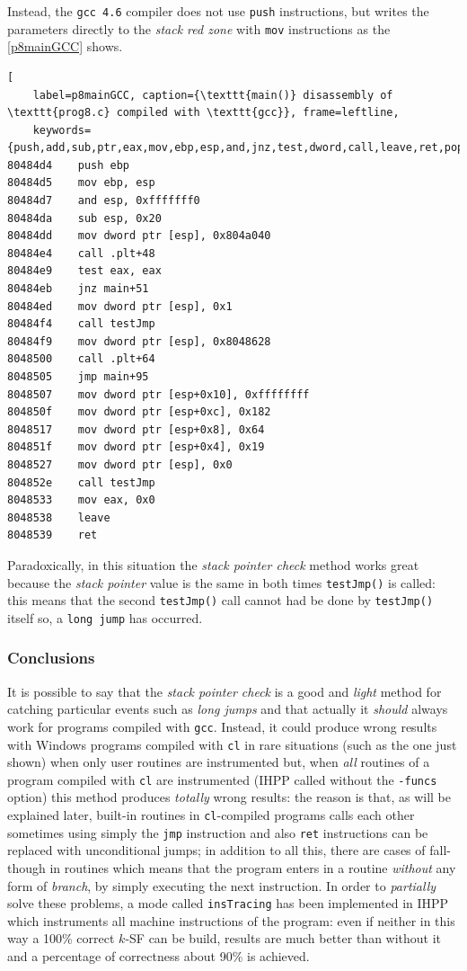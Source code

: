 \documentclass[a4paper,10pt]{report}
\begin{document}
\noindent
Instead, the \verb|gcc 4.6| compiler does not use \verb|push| instructions, but
writes the parameters directly to the \emph{stack red zone} 
with \verb|mov| instructions as the \cref{p8mainGCC} shows.

\begin{lstlisting}[ 
	label=p8mainGCC, caption={\texttt{main()} disassembly of \texttt{prog8.c} compiled with \texttt{gcc}}, frame=leftline, 
	keywords={push,add,sub,ptr,eax,mov,ebp,esp,and,jnz,test,dword,call,leave,ret,pop,jmp}]
80484d4    push ebp
80484d5    mov ebp, esp
80484d7    and esp, 0xfffffff0
80484da    sub esp, 0x20
80484dd    mov dword ptr [esp], 0x804a040
80484e4    call .plt+48
80484e9    test eax, eax
80484eb    jnz main+51
80484ed    mov dword ptr [esp], 0x1
80484f4    call testJmp
80484f9    mov dword ptr [esp], 0x8048628
8048500    call .plt+64
8048505    jmp main+95
8048507    mov dword ptr [esp+0x10], 0xffffffff
804850f    mov dword ptr [esp+0xc], 0x182
8048517    mov dword ptr [esp+0x8], 0x64
804851f    mov dword ptr [esp+0x4], 0x19
8048527    mov dword ptr [esp], 0x0
804852e    call testJmp
8048533    mov eax, 0x0
8048538    leave 
8048539    ret 
\end{lstlisting}

\noindent
Paradoxically, in this situation the \emph{stack pointer check} method works
great because the \emph{stack pointer} value is the same in both times \verb|testJmp()|
is called: this means that the second \verb|testJmp()| call cannot had be done by \verb|testJmp()| itself so, a \verb|long jump| has occurred.

\subsubsection{Conclusions}
It is possible to say that the \emph{stack pointer check} is
a good and \emph{light} method for catching particular events such as \emph{long jumps}
and that actually it \emph{should} always work for programs compiled with \verb|gcc|.
Instead, it could produce wrong results with Windows programs compiled with \verb|cl|
in rare situations (such as the one just shown) when only user routines are instrumented but, when \emph{all} routines of a program compiled with \verb|cl| are instrumented (IHPP called without the \verb|-funcs| option) this method produces \emph{totally} wrong results:
the reason is that, as will be explained later, built-in routines in \verb|cl|-compiled programs calls each other sometimes using simply the \verb|jmp| instruction and also 
\verb|ret| instructions can be replaced with unconditional jumps; in addition to
all this, there are cases of fall-though in routines which means that the program 
enters in a routine \emph{without} any form of \emph{branch}, by simply executing 
the next instruction. In order to \emph{partially} solve these problems, 
a mode called \verb|insTracing| has been implemented in IHPP which instruments all machine instructions of the program: even if neither in this way a 100\% correct $k$-SF 
can be build, results are much better than without it and a percentage of correctness 
about 90\% is achieved.    
\end{document}
